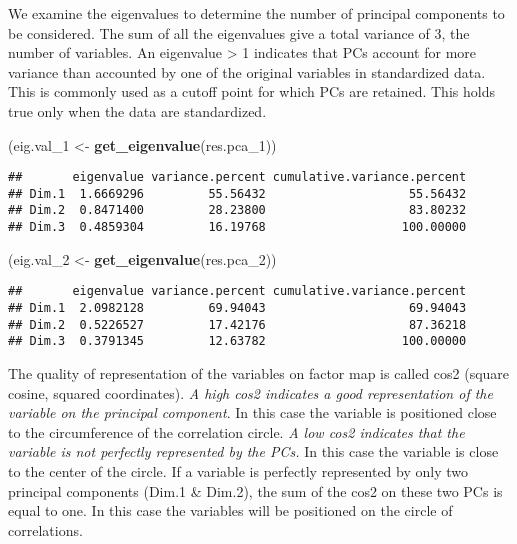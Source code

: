 \documentclass[
]{article}
\newenvironment{Shaded}{\begin{snugshade}}{\end{snugshade}}
\newcommand{\FunctionTok}[1]{\textcolor[rgb]{0.13,0.29,0.53}{\textbf{#1}}}
\newcommand{\NormalTok}[1]{#1}
\newcommand{\OtherTok}[1]{\textcolor[rgb]{0.56,0.35,0.01}{#1}}
\begin{document}
We examine the eigenvalues to determine the number of principal
components to be considered. The sum of all the eigenvalues give a total
variance of 3, the number of variables. An eigenvalue \textgreater{} 1
indicates that PCs account for more variance than accounted by one of
the original variables in standardized data. This is commonly used as a
cutoff point for which PCs are retained. This holds true only when the
data are standardized.

\begin{Shaded}
\begin{Highlighting}[]
\NormalTok{(eig.val\_1 }\OtherTok{\textless{}{-}} \FunctionTok{get\_eigenvalue}\NormalTok{(res.pca\_1))}
\end{Highlighting}
\end{Shaded}

\begin{verbatim}
##       eigenvalue variance.percent cumulative.variance.percent
## Dim.1  1.6669296         55.56432                    55.56432
## Dim.2  0.8471400         28.23800                    83.80232
## Dim.3  0.4859304         16.19768                   100.00000
\end{verbatim}

\begin{Shaded}
\begin{Highlighting}[]
\NormalTok{(eig.val\_2 }\OtherTok{\textless{}{-}} \FunctionTok{get\_eigenvalue}\NormalTok{(res.pca\_2))}
\end{Highlighting}
\end{Shaded}

\begin{verbatim}
##       eigenvalue variance.percent cumulative.variance.percent
## Dim.1  2.0982128         69.94043                    69.94043
## Dim.2  0.5226527         17.42176                    87.36218
## Dim.3  0.3791345         12.63782                   100.00000
\end{verbatim}

The quality of representation of the variables on factor map is called
cos2 (square cosine, squared coordinates). \emph{A high cos2 indicates a
good representation of the variable on the principal component}. In this
case the variable is positioned close to the circumference of the
correlation circle. \emph{A low cos2 indicates that the variable is not
perfectly represented by the PCs.} In this case the variable is close to
the center of the circle. If a variable is perfectly represented by only
two principal components (Dim.1 \& Dim.2), the sum of the cos2 on these
two PCs is equal to one. In this case the variables will be positioned
on the circle of correlations.
\end{document}
